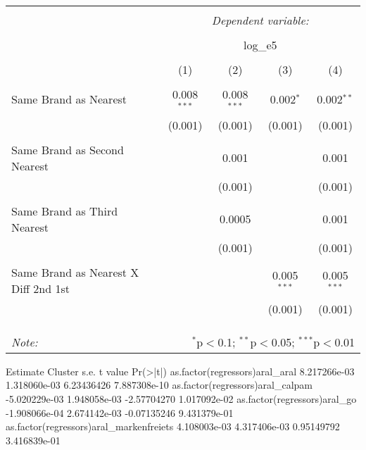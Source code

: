 
\begin{table}[!htbp] \centering 
  \caption{} 
  \label{} 
\begin{tabular}{@{\extracolsep{5pt}}lcccc} 
\\[-1.8ex]\hline 
\hline \\[-1.8ex] 
 & \multicolumn{4}{c}{\textit{Dependent variable:}} \\ 
\cline{2-5} 
\\[-1.8ex] & \multicolumn{4}{c}{log\_e5} \\ 
\\[-1.8ex] & (1) & (2) & (3) & (4)\\ 
\hline \\[-1.8ex] 
 Same Brand as Nearest & 0.008$^{***}$ & 0.008$^{***}$ & 0.002$^{*}$ & 0.002$^{**}$ \\ 
  & (0.001) & (0.001) & (0.001) & (0.001) \\ 
  & & & & \\ 
 Same Brand as Second Nearest &  & 0.001 &  & 0.001 \\ 
  &  & (0.001) &  & (0.001) \\ 
  & & & & \\ 
 Same Brand as Third Nearest &  & 0.0005 &  & 0.001 \\ 
  &  & (0.001) &  & (0.001) \\ 
  & & & & \\ 
 Same Brand as Nearest X Diff 2nd 1st &  &  & 0.005$^{***}$ & 0.005$^{***}$ \\ 
  &  &  & (0.001) & (0.001) \\ 
  & & & & \\ 
\hline \\[-1.8ex] 
\hline 
\hline \\[-1.8ex] 
\textit{Note:}  & \multicolumn{4}{r}{$^{*}$p$<$0.1; $^{**}$p$<$0.05; $^{***}$p$<$0.01} \\ 
\end{tabular} 
\end{table} 
                                             Estimate Cluster s.e.     t value     Pr(>|t|)
as.factor(regressors)aral_aral           8.217266e-03 1.318060e-03  6.23436426 7.887308e-10
as.factor(regressors)aral_calpam        -5.020229e-03 1.948058e-03 -2.57704270 1.017092e-02
as.factor(regressors)aral_go            -1.908066e-04 2.674142e-03 -0.07135246 9.431379e-01
as.factor(regressors)aral_markenfreiets  4.108003e-03 4.317406e-03  0.95149792 3.416839e-01
